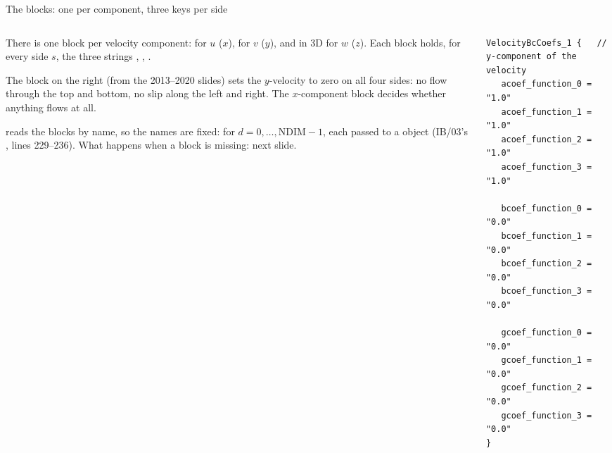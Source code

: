 \documentclass[aspectratio=169,11pt]{beamer}
\begin{document}
\begin{frame}[fragile]{The  blocks: one per component, three keys per side}
\label{fr:blocks}
\begin{columns}[T,onlytextwidth]
\begin{column}{0.46\textwidth}
\footnotesize There is one block per velocity component:  for $u$ ($x$),  for $v$ ($y$), and in 3D  for $w$ ($z$). Each block holds, for every side $s$, the three strings , , .
\vspace{1mm}

\footnotesize The block on the right (from the 2013--2020 slides) sets the $y$-velocity to zero on all four sides: no flow through the top and bottom, no slip along the left and right. The $x$-component block decides whether anything flows at all.
\vspace{1mm}

\footnotesize {} reads the blocks by name, so the names are fixed:  for $d = 0,\ldots,\mathrm{NDIM}-1$, each passed to a  object (IB/03's , lines 229--236). What happens when a block is missing: next slide.
\end{column}
\begin{column}{0.52\textwidth}
\begin{lstlisting}[style=inputtiny]
VelocityBcCoefs_1 {   // y-component of the velocity
   acoef_function_0 = "1.0"
   acoef_function_1 = "1.0"
   acoef_function_2 = "1.0"
   acoef_function_3 = "1.0"

   bcoef_function_0 = "0.0"
   bcoef_function_1 = "0.0"
   bcoef_function_2 = "0.0"
   bcoef_function_3 = "0.0"

   gcoef_function_0 = "0.0"
   gcoef_function_1 = "0.0"
   gcoef_function_2 = "0.0"
   gcoef_function_3 = "0.0"
}
\end{lstlisting}
\end{column}
\end{columns}
\end{frame}
\end{document}
